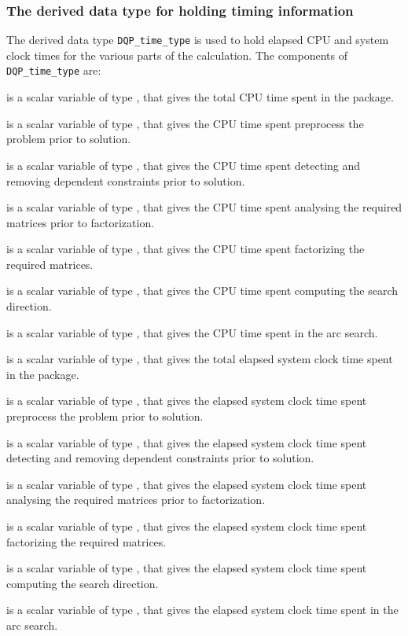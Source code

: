 \documentclass{galahad}
\newcommand{\packagename}{DQP}
\begin{document}



\subsubsection{The derived data type for holding timing
 information}\label{typetime}
The derived data type
{\tt \packagename\_time\_type}
is used to hold elapsed CPU and system clock times for the various parts of
the calculation. The components of
{\tt \packagename\_time\_type}
are:
\begin{description}
 is a scalar variable of type \realdp, that gives
 the total CPU time spent in the package.

 is a scalar variable of type \realdp, that gives
 the CPU time spent preprocess the problem prior to solution.

 is a scalar variable of type \realdp, that gives
 the CPU time spent detecting and removing dependent constraints prior
to solution.

 is a scalar variable of type \realdp, that gives
 the CPU time spent analysing the required matrices prior to factorization.

 is a scalar variable of type \realdp, that gives
 the CPU time spent factorizing the required matrices.

 is a scalar variable of type \realdp, that gives
 the CPU time spent computing the search direction.

 is a scalar variable of type \realdp, that gives
 the CPU time spent in the arc search.

 is a scalar variable of type \realdp, that gives
 the total elapsed system clock time spent in the package.

 is a scalar variable of type \realdp, that gives
 the elapsed system clock time spent preprocess the problem prior to solution.

 is a scalar variable of type \realdp,
that gives  the elapsed system clock time spent detecting and removing
dependent constraints prior to solution.

 is a scalar variable of type \realdp, that gives
 the elapsed system clock time spent analysing the required matrices prior to
factorization.

 is a scalar variable of type \realdp, that gives
 the elapsed system clock time spent factorizing the required matrices.

 is a scalar variable of type \realdp, that gives
 the elapsed system clock time spent computing the search direction.

 is a scalar variable of type \realdp, that gives
 the elapsed system clock time spent in the arc search.

\end{description}
\end{document}
